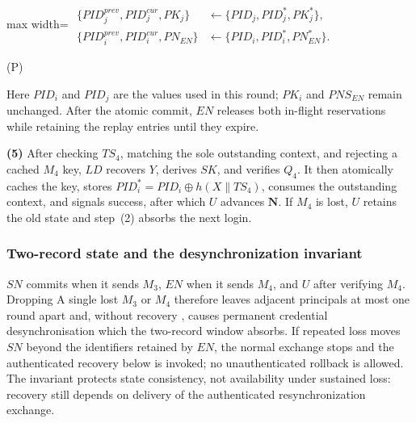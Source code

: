 \documentclass[cmc,article,submit,moreauthors,pdftex]{Definitions/tsp}
\newcommand{\cc}{\mathbin{\|}}
\newcounter{protoeq} %
\newenvironment{ceq}{%
  \refstepcounter{protoeq}%
  \par\vspace{-3pt}\setlength{\topsep}{0pt}\setlength{\partopsep}{0pt}\begin{center}%
}{%
  \hspace{0.45em}\textup{(P\theprotoeq)}%
  \end{center}\vspace{-3pt}%
} %
\providecommand{\DIFadd}[1]{{\protect\color{blue} \sf #1}} %
\providecommand{\DIFdel}[1]{{\protect\color{red} \scriptsize #1}} %
\providecommand{\DIFaddbegin}{} %
\providecommand{\DIFaddend}{} %
\providecommand{\DIFdelbegin}{} %
\providecommand{\DIFdelend}{} %
\begin{document}
\DIFdelbegin %
\DIFdelend \DIFaddbegin \begin{ceq}
\DIFaddend \begin{adjustbox}{max width=\columnwidth}
$\displaystyle\begin{aligned}
\{PID_j^{prev}, PID_j^{cur}, PK_j\} &\leftarrow \{PID_j, PID_j^{*}, PK_j^{*}\},\\
\{PID_i^{prev}, PID_i^{cur}, PN_{EN}\} &\leftarrow \{PID_i, PID_i^{*}, PN_{EN}^{*}\}.
\end{aligned}$
\end{adjustbox}
\DIFdelbegin %
\DIFdelend \DIFaddbegin \end{ceq}
\DIFaddend 

Here $PID_i$ and $PID_j$ are the values used in this round; $PK_i$ and $PNS_{EN}$ remain unchanged. After the atomic commit, $EN$ releases both in-flight reservations while retaining the replay entries until they expire.

\textbf{(5)} After checking $TS_4$, matching the sole outstanding context, and rejecting a cached $M_4$ key, $LD$ recovers $Y$, derives $SK$, and verifies $Q_4$. It then atomically caches the key, stores $PID_i^{*}=PID_i\oplus h(X\cc TS_4)$, consumes the outstanding context, and signals success, after which $U$ advances $\mathbf{N}$. If $M_4$ is lost, $U$ retains the old state and step~(2) absorbs the next login.

\DIFdelbegin %
\DIFdelend \DIFaddbegin \subsubsection{Two-record state and the desynchronization invariant}\DIFaddend \label{sec:desync}

$SN$ commits when it sends $M_3$, $EN$ when it sends $M_4$, and $U$ after verifying $M_4$. \DIFdelbegin \DIFdel{Dropping }\DIFdelend \DIFaddbegin \DIFadd{A single lost }\DIFaddend $M_3$ or $M_4$ therefore leaves adjacent principals \DIFaddbegin \DIFadd{at most }\DIFaddend one round apart\DIFdelbegin \DIFdel{and, without recovery }\DIFdelend , \DIFdelbegin \DIFdel{causes permanent credential desynchronisation}\DIFdelend \DIFaddbegin \DIFadd{which the two-record window absorbs. If repeated loss moves $SN$ beyond the identifiers retained by $EN$, the normal exchange stops and the authenticated recovery below is invoked; no unauthenticated rollback is allowed. The invariant protects state consistency, not availability under sustained loss: recovery still depends on delivery of the authenticated resynchronization exchange}\DIFaddend .
\end{document}
